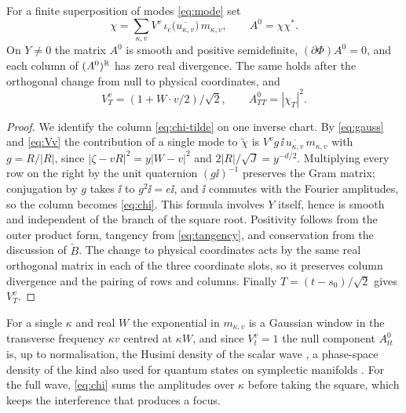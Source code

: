 \begin{proposition}\label{prop:current}
For a finite superposition of modes \eqref{eq:mode} set
\begin{equation}\label{eq:chi}
\chi=\sum_{\kappa,v}V^v\,\iota_e\bigl(\overline{u_{\kappa,v}}\bigr)\,m_{\kappa,v},\qquad A^0=\chi\chi^* .
\end{equation}
On $Y\ne0$ the matrix $A^0$ is smooth and positive semidefinite, $(\partial\Phi)A^0=0$, and each
column of $(A^0)^{\mathbb{R}}$ has zero real divergence. The same holds after the orthogonal change
from null to physical coordinates, and
\[
V^v_T=(1+W\cdot v/2)/\sqrt2,\qquad A^0_{TT}=|\chi_T|^2 .
\]
\end{proposition}

\begin{proof}
We identify the column \eqref{eq:chi-tilde} on one inverse chart. By \eqref{eq:gauss} and
\eqref{eq:Vv} the contribution of a single mode to $\widetilde\chi$ is
$V^v g\,\ii\,\overline{u_{\kappa,v}}\,m_{\kappa,v}$ with $g=R/|R|$, since
$|\zeta-vR|^2=y|W-v|^2$ and $2|R|/\sqrt J=y^{-d/2}$. Multiplying every row on the right by the
unit quaternion $(g\ii)^{-1}$ preserves the Gram matrix; conjugation by $g$ takes $\ii$ to
$g^2\ii=e\ii$, and $\ii$ commutes with the Fourier amplitudes, so the column becomes
\eqref{eq:chi}. This formula involves $Y$ itself, hence is smooth and independent of the
branch of the square root. Positivity follows from the outer product form, tangency from
\eqref{eq:tangency}, and conservation from the discussion of $\widetilde B$. The change to
physical coordinates acts by the same real orthogonal matrix in each of the three coordinate
slots, so it preserves column divergence and the pairing of rows and columns. Finally
$T=(t-s_0)/\sqrt2$ gives $V^v_T$.
\end{proof}

For a single $\kappa$ and real $W$ the exponential in $m_{\kappa,v}$ is a Gaussian window in the
transverse frequency $\kappa v$ centred at $\kappa W$, and since $V^v_t=1$ the null component
$A^0_{tt}$ is, up to normalisation, the Husimi density of the scalar wave
\cite{Hus40,KLO16}, a phase-space density of the kind also used for quantum states on
symplectic manifolds \cite{Bha26a}. For the full wave, \eqref{eq:chi} sums the amplitudes
over $\kappa$ before taking the square, which keeps the interference that produces a focus.

